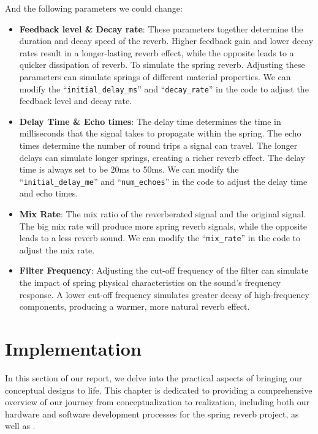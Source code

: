 \documentclass[12pt]{article}
\begin{document}
And the following parameters we could change:

\begin{itemize}
	\item \textbf{Feedback level \& Decay rate}:  These parameters together determine the duration and decay speed of the reverb. Higher feedback gain and lower decay rates result in a longer-lasting reverb effect, while the opposite leads to a quicker dissipation of reverb. To simulate the spring reverb. Adjusting these parameters can simulate springs of different material properties. We can modify the ``\texttt{initial\_delay\_ms}'' and ``\texttt{decay\_rate}'' in the code to adjust the feedback level and decay rate.
	
	\item \textbf{Delay Time \& Echo times}: The delay time determines the time in milliseconds that the signal takes to propagate within the spring. The echo times determine the number of round trips a signal can travel. The longer delays can simulate longer springs, creating a richer reverb effect. The delay time is always set to be 20ms to 50ms. We can modify the ``\texttt{initial\_delay\_me}'' and ``\texttt{num\_echoes}'' in the code to adjust the delay time and echo times.
	
	\item \textbf{Mix Rate}: The mix ratio of the reverberated signal and the original signal. The big mix rate will produce more spring reverb signals, while the opposite leads to a less reverb sound. We can modify the ``\texttt{mix\_rate}'' in the code to adjust the mix rate.

	\item \textbf{Filter Frequency}: Adjusting the cut-off frequency of the filter can simulate the impact of spring physical characteristics on the sound's frequency response. A lower cut-off frequency simulates greater decay of high-frequency components, producing a warmer, more natural reverb effect.
	
\end{itemize}

\newpage
\section{Implementation}

In this section of our report, we delve into the practical aspects of bringing our conceptual designs to life. This chapter is dedicated to providing a comprehensive overview of our journey from conceptualization to realization, including both our hardware and software development processes for the spring reverb project, as well as .
\end{document}
